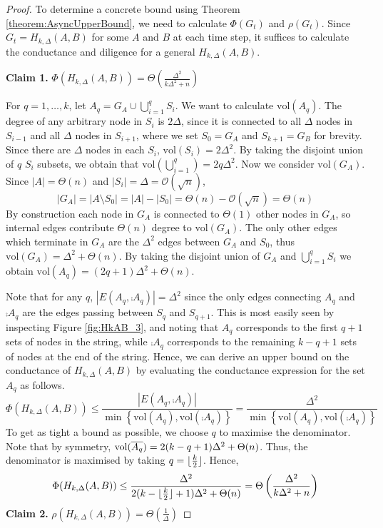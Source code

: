 \begin{proof}
	To determine a concrete bound using Theorem \ref{theorem:AsyncUpperBound}, we need to calculate $\Phi(G_t)$ and $\rho(G_t)$. Since $G_t = H_{k, \Delta}(A, B)$ for some $A$ and $B$ at each time step, it suffices to calculate the conductance and diligence for a general $H_{k, \Delta}(A, B)$.

	\textbf{Claim 1.} $\Phi(H_{k, \Delta}(A, B)) = \Theta\left(\frac{\Delta^2}{k\Delta^2 +n }\right)$

	For $q = 1, \dots, k$, let $A_q = G_A \cup \bigcup_{i=1}^q  S_i$. We want to calculate $\text{vol}(A_q)$. The degree of any arbitrary node in $S_i$ is $2\Delta$, since it is connected to all $\Delta$ nodes in $S_{i-1}$ and all $\Delta$ nodes in $S_{i+1}$, where we set $S_0 = G_A$ and $S_{k+1} = G_B$ for brevity. Since there are $\Delta$ nodes in each $S_i$, $\text{vol}(S_i) = 2\Delta^2$. By taking the disjoint union of $q$ $S_i$ subsets, we obtain that $\text{vol}(\bigcup_{i=1}^q) = 2q\Delta^2$. Now we consider $\text{vol}(G_A)$. Since $|A| = \Theta(n)$ and $|S_i| = \Delta = \mathcal{O}(\sqrt{n})$, 
	$$
		|G_A| = |A \setminus S_0| = |A| - |S_0| = \Theta(n) - \mathcal{O}(\sqrt{n}) = \Theta(n)
	$$
	By construction each node in $G_A$ is connected to $\Theta(1)$
	other nodes in $G_A$, so internal edges contribute $\Theta(n)$ degree to $\text{vol}(G_A)$. The only other edges which terminate in $G_A$ are the $\Delta^2$ edges between $G_A$ and $S_0$, thus $\text{vol}(G_A) = \Delta^2 + \Theta(n)$. By taking the disjoint union of $G_A$ and $\bigcup_{i=1}^q S_i$ we obtain $\text{vol}(A_q) = (2q + 1)\Delta^2 + \Theta(n)$. 
	
	Note that for any $q$, $|E(A_q,\comp{A_q})| = \Delta^2$ since the only edges connecting $A_q$ and $\comp{A_q}$ are the edges passing between $S_q$ and $S_{q+1}$. This is most easily seen by inspecting Figure \ref{fig:HkAB_3}, and noting that $A_q$ corresponds to the first $q + 1$ sets of nodes in the string, while $\comp{A_q}$ corresponds to the remaining $k - q + 1$ sets of nodes at the end of the string.
	Hence, we can derive an upper bound on the conductance of $H_{k, \Delta}(A, B)$ by evaluating the conductance expression for the set $A_q$ as follows.
	$$
		\Phi(H_{k, \Delta}(A, B)) 
		\leq \frac{|E(A_q, \comp{A_q})|}{\min \left\{ \text{vol}(A_q), \text{vol}(\comp{A_q}) \right\} } 
		= \frac{\Delta^2}{\min \left\{ \text{vol}(A_q), \text{vol}(\comp{A_q}) \right\}}
	$$	
	To get as tight a bound as possible, we choose $q$ to maximise the denominator. Note that by symmetry, $\text{vol}(\overline{A_q}) = 2(k - q + 1)\Delta^2 + \Theta(n)$. Thus, the denominator is maximised by taking $q = \lfloor\frac{k}{2}\rfloor$. Hence,
	$$
		\Phi(H_{k, \Delta}(A, B)) 
		\leq \frac{\Delta^2}{2(k - \lfloor\frac{k}{2}\rfloor + 1)\Delta^2 + \Theta(n)}
		= \Theta\left(\frac{\Delta^2}{k\Delta^2 + n}\right)
	$$
	\textbf{Claim 2.} $\rho(H_{k, \Delta}(A,B)) = \Theta\left(\frac{1}{\Delta}\right)$


\end{proof}
